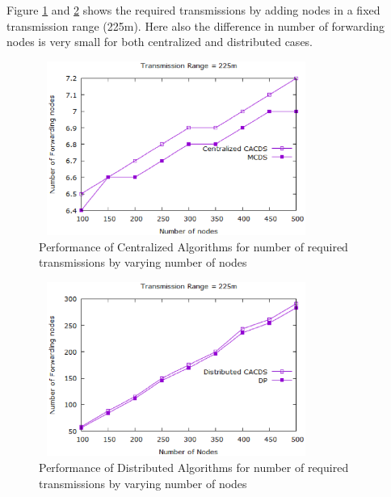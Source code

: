 Figure \ref{outf225c} and \ref{outf225d} shows the required transmissions by adding nodes in a fixed transmission range (225m). Here also the difference in number of forwarding nodes is very small for both centralized and distributed cases. 
\begin{figure}[h]
    \centering
    \includegraphics[width=90mm, height=57mm]{Figures/outf225c.eps}
    \caption{Performance of Centralized Algorithms for number of required transmissions by varying number of nodes}
    \label{outf225c}
    \end{figure}
    \begin{figure}[h]
    \centering
    \includegraphics[width=90mm, height=57mm]{Figures/outf225d.eps}
    \caption{Performance of Distributed Algorithms for number of required transmissions by varying number of nodes}
    \label{outf225d}
\end{figure}

